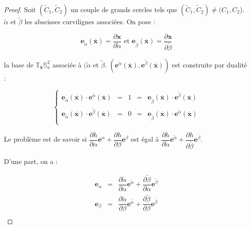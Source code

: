 \begin{proof}
Soit $(\tilde{C}_1, \tilde{C}_2)$ un couple de grands cercles tels que  $(\tilde{C}_1, \tilde{C}_2) \neq (C_1, C_2$). $\tilde{\alpha}$ et $\tilde{\beta}$ les abscisses curvilignes associées. On pose :

\begin{equation}
\mathbf{e}_{\tilde{\alpha}}(\overline{\mathbf{x}}) = \dfrac{\partial \mathbf{x}}{\partial \tilde{\alpha}} \text{ et } \mathbf{e}_{\tilde{\beta}}(\overline{\mathbf{x}}) = \dfrac{\partial \mathbf{x}}{\partial \tilde{\beta}}
\end{equation}

la base de $\mathbb{T}_{\overline{\mathbf{x}}}\mathbb{S}_a^2$ associée à $(\tilde{\alpha}$ et $\tilde{\beta}$. $\left( \mathbf{e}^{\tilde{\alpha}}(\overline{\mathbf{x}}), \mathbf{e}^{\tilde{\beta}}(\overline{\mathbf{x}}) \right)$ est construite par dualité :

\begin{equation}
\left\lbrace
\begin{array}{rcccl}
\mathbf{e}_{\tilde{\alpha}}(\overline{\mathbf{x}}) \cdot \mathbf{e}^{\tilde{\alpha}}(\overline{\mathbf{x}}) & = & 1 & = & \mathbf{e}_{\tilde{\beta}}(\overline{\mathbf{x}}) \cdot \mathbf{e}^{\tilde{\beta}}(\overline{\mathbf{x}}) \\
\mathbf{e}_{\tilde{\alpha}}(\overline{\mathbf{x}}) \cdot \mathbf{e}^{\tilde{\beta}}(\overline{\mathbf{x}}) & = & 0 & = & \mathbf{e}_{\tilde{\beta}}(\overline{\mathbf{x}}) \cdot \mathbf{e}^{\tilde{\alpha}}(\overline{\mathbf{x}}) \\
\end{array}
\right.
\end{equation}

Le problème est de savoir si $\dfrac{\partial h}{\partial \alpha} \mathbf{e}^{\alpha} + \dfrac{\partial h}{\partial \beta} \mathbf{e}^{\beta}$ est égal à $\dfrac{\partial h}{\partial \tilde{\alpha}} \mathbf{e}^{\tilde{\alpha}} + \dfrac{\partial h}{\partial \tilde{\beta}} \mathbf{e}^{\tilde{\beta}}$.

D'une part, on a :

\begin{equation}
\begin{array}{rcl}
\mathbf{e}_{\alpha} & = & \dfrac{\partial \tilde{\alpha}}{\partial \alpha} \mathbf{e}^{\tilde{\alpha}} + \dfrac{\partial \tilde{\beta}}{\partial \alpha} \mathbf{e}^{\tilde{\beta}} \\
\mathbf{e}_{\beta} & = & \dfrac{\partial \tilde{\alpha}}{\partial \beta} \mathbf{e}^{\tilde{\alpha}} + \dfrac{\partial \tilde{\beta}}{\partial \beta} \mathbf{e}^{\tilde{\beta}} \\
\end{array}
\end{equation}


\end{proof}
